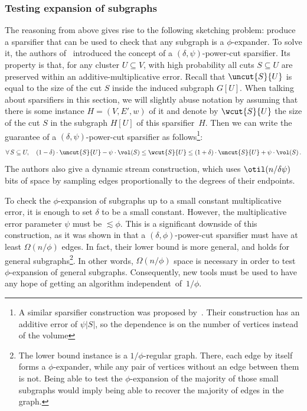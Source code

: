 \subsubsection*{Testing expansion of subgraphs}
The reasoning from above gives rise to the following sketching problem: produce a sparsifier that can be used to check that any subgraph is a $\phi$-expander. To solve it, the authors of~\cite{streamexpdec} introduced the concept of a $(\delta,\psi)$-power-cut sparsifier. Its property is that, for any cluster $U \subseteq V$, with high probability all cuts $S \subseteq U$ are preserved within an additive-multiplicative error.
Recall that $\uncut{S}{U}$ is equal to the size of the cut $S$ inside the induced subgraph $G[U]$.
When talking about sparsifiers in this section, we will slightly abuse notation by assuming that there is some instance $H=(V,E',w)$ of it and denote by $\wcut{S}{U}$ the size of the cut $S$ in the subgraph $H[U]$ of this sparsifier~$H$. Then we can write the guarantee of a $(\delta, \psi)$-power-cut sparsifier as follows\footnote{A similar sparsifier construction was proposed by~\cite{sublinhierarchical}. Their construction has an additive error of $\psi |S|$, so the dependence is on the number of vertices instead of the volume}:
\begin{equation*}
	\forall \, S \subseteq U, \quad  (1-\delta)\cdot \uncut{S}{U}-\psi \cdot \vol(S) \le \wcut{S}{U} \le (1+\delta)\cdot \uncut{S}{U}+\psi \cdot \vol(S) \, .
\end{equation*}
The authors also give a dynamic stream construction, which uses $\otil(n/\delta\psi)$ bits of space by sampling edges proportionally to the degrees of their endpoints.


To check the $\phi$-expansion of subgraphs up to a small constant multiplicative error, it is enough to set $\delta$ to be a small constant. However, the multiplicative error parameter $\psi$ must be $\lesssim \phi$. 
This is a significant downside of this construction, as it was shown in \cite{streamexpdec} that a $(\delta, \phi)$-power-cut sparsifier must have at least $\Omega(n /\phi)$ edges. In fact, their lower bound is more general, and holds for general subgraphs\footnote{The lower bound instance is a $1/\phi$-regular graph. There, each edge by itself forms a $\phi$-expander, while any pair of vertices without an edge between them is not. Being able to test the $\phi$-expansion of the majority of those small subgraphs would imply being able to recover the majority of edges in the graph.}.
In other words, {$\Omega(n/\phi)$} space is necessary in order to test {$\phi$}-expansion of general subgraphs. Consequently, new tools must be used to have any hope of getting an algorithm independent~of~$1 / \phi$.

